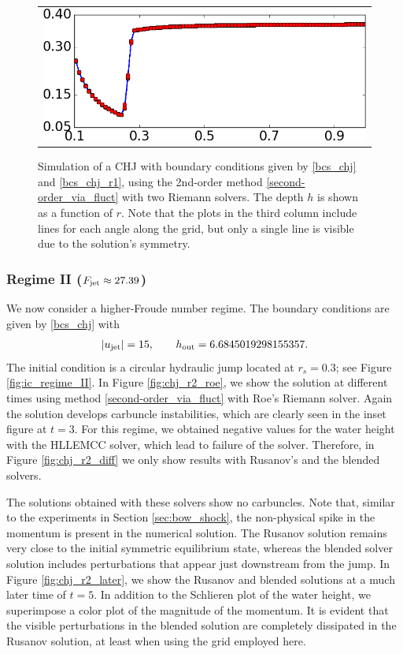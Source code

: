 \documentclass[preprint, 11pt]{article}
\newcommand{\out}{\textup{out}}
\newcommand{\jet}{{\textup{jet}}}
\newcommand{\bfu}{{u}}
\begin{document}
\begin{figure}
{\begin{tabular}{c}
      \includegraphics[scale=0.27,valign=c]{figures/chj_slices_delta1p0_blended.png} 
    \end{tabular}
  }    
  \caption{Simulation of a CHJ with boundary conditions given by \eqref{bcs_chj} and \eqref{bcs_chj_r1},
    using the 2nd-order method \eqref{second-order_via_fluct} with two Riemann solvers. The depth $h$
    is shown as a function of $r$.  Note that the plots in the third column include lines for
    each angle along the grid, but only a single line is visible due to the solution's symmetry.
    \label{fig:stab_shock}}
\end{figure}

\subsubsection{Regime II ($F_\jet\approx27.39$)}\label{sec:regime_ii}
We now consider a higher-Froude number regime. The boundary conditions are
given by \eqref{bcs_chj} with 
\begin{align}\label{bcs_chj_r2}
  |\bfu_\jet|=15, \qquad h_\out=6.6845019298155357.
\end{align}
The initial condition is a circular hydraulic jump located at $r_s=0.3$; see Figure \ref{fig:ic_regime_II}.
In Figure \ref{fig:chj_r2_roe}, we show the solution at different times using method
\eqref{second-order_via_fluct} with Roe's Riemann solver. Again the solution develops
carbuncle instabilities, which are clearly seen in the inset figure at $t=3$.
For this regime, we obtained negative values for the water height with
the HLLEMCC solver, which lead to failure of the solver. Therefore, in Figure
\ref{fig:chj_r2_diff} we only show results with Rusanov's and the blended
solvers.  

The solutions obtained with these solvers show no carbuncles.
Note that, similar to the experiments in Section \ref{sec:bow_shock},
the non-physical spike in the momentum is present in the numerical solution.
The Rusanov solution remains very close to the initial symmetric equilibrium state,
whereas the blended solver solution includes perturbations that appear
just downstream from the jump.
In Figure \ref{fig:chj_r2_later}, we show the Rusanov and blended solutions at
a much later time of $t=5$.  In addition to the Schlieren plot of the water
height, we superimpose a color plot of the magnitude of the momentum. 
It is evident that the visible perturbations in the blended solution are
completely dissipated in the Rusanov solution, at least when using the grid employed here.
\end{document}
